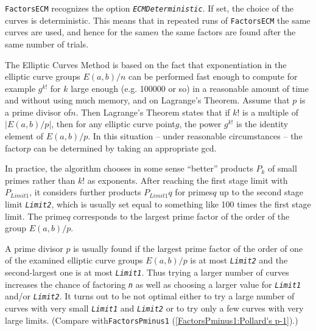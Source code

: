 \documentclass[a4paper,11pt]{report}
\begin{document}
{{{ \texttt{FactorsECM} recognizes the option \mbox{\texttt{\slshape ECMDeterministic}}. If set, the choice of the curves is deterministic. This means that in
repeated runs of \texttt{FactorsECM} the same curves are used, and hence for the same{\nobreakspace}$n$ the same factors are found after the same number of trials. 

 The Elliptic Curves Method is based on the fact that exponentiation in the  elliptic curve groups $E(a,b)/n$ can be performed fast enough to compute for example $g^{k!}$ for $k$ large enough (e.g. 100000 or so) in a reasonable amount of time and without
using much memory, and on Lagrange's Theorem. Assume that $p$ is a prime divisor of{\nobreakspace}$n$. Then Lagrange's Theorem states that if $k!$ is a multiple of $|E(a,b)/p|$, then for any  elliptic curve point{\nobreakspace}$g$, the power $g^{k!}$ is the identity element of $E(a,b)/p$. In this situation -- under reasonable circumstances -- the
factor{\nobreakspace}$p$ can be determined by taking an appropriate gcd. 

 In practice, the algorithm chooses in some sense ``better'' products $P_k$ of small primes rather than $k!$ as exponents. After reaching the first stage limit with $P_{Limit1}$, it considers further products $P_{Limit1}q$ for primes{\nobreakspace}$q$ up to the second stage limit \mbox{\texttt{\slshape Limit2}}, which is usually set equal to something like 100 times the first stage
limit. The prime{\nobreakspace}$q$ corresponds to the largest prime factor of the order of the group $E(a,b)/p$. 

 A prime divisor $p$ is usually found if the largest prime factor of the order of one of the
examined elliptic curve groups $E(a,b)/p$ is at most \mbox{\texttt{\slshape Limit2}} and the second-largest one is at most \mbox{\texttt{\slshape Limit1}}. Thus trying a larger number of curves increases the chance of factoring \mbox{\texttt{\slshape n}} as well as choosing a larger value for \mbox{\texttt{\slshape Limit1}} and/or \mbox{\texttt{\slshape Limit2}}. It turns out to be not optimal either to try a large number of curves with
very small \mbox{\texttt{\slshape Limit1}} and \mbox{\texttt{\slshape Limit2}} or to try only a few curves with very large limits. (Compare
with{\nobreakspace}\texttt{FactorsPminus1} (\ref{FactorsPminus1:Pollard's p-1}).) 

}}}
\end{document}
